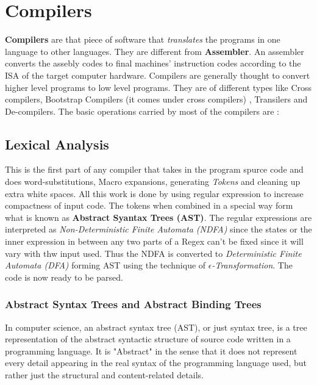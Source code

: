 \chapter{Compilers}

\textbf{Compilers} are that piece of software that \textit{translates} the programs in one language to other languages. They are different from \textbf{Assembler}. An assembler converts the assebly codes to final machines' instruction codes according to the ISA of the target computer hardware. Compilers are generally thought to convert higher level programs to low level programs. They are of different types like Cross compilers, Bootstrap Compilers (it comes under cross compilers)
, Transilers and De-compilers. The basic operations carried by most of the compilers are :\\

\section{Lexical Analysis}
This is the first part of any compiler that takes in the program spurce code and does word-substitutions, Macro expansions, generating \textit{Tokens} and cleaning up extra white spaces. All this work is done by using regular expression to increase compactness of input code. The tokens when combined in a special way form what is known as \textbf{Abstract Syantax Trees (AST)}. The regular expressions are interpreted as \textit{Non-Deterministic Finite Automata (NDFA)} since the states or the inner expression in between any two parts of a Regex can't be fixed since it will vary with thw input used. Thus the NDFA is converted to \textit{Deterministic Finite Automata (DFA)} forming AST using the technique of \textit{$\epsilon$-Transformation}. The code is now ready to be parsed.\\

\subsection{Abstract Syntax Trees and Abstract Binding Trees}
In computer science, an abstract syntax tree (AST), or just syntax tree, is a tree representation of the abstract syntactic structure of source code written in a programming language. It is "Abstract" in the sense that it does not represent every detail appearing in the real syntax of the programming language used, but rather just the structural and content-related details.\\


